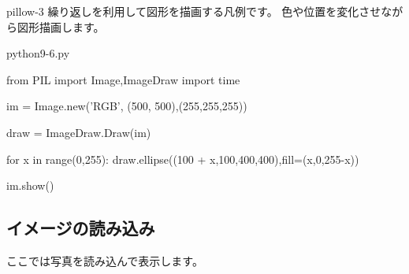 \documentclass[11pt,a4paper,dvipdfmx,titlepage]{jsreport}
\begin{document}
\begin{pabox}{pillow-3}
繰り返しを利用して図形を描画する凡例です。
色や位置を変化させながら図形描画します。


\begin{codebox}{python9-6.py}
\begin{listing}{1}
from PIL import Image,ImageDraw
import time

im = Image.new('RGB', (500, 500),(255,255,255))

draw = ImageDraw.Draw(im)

for x in range(0,255):
    draw.ellipse((100 + x,100,400,400),fill=(x,0,255-x))  

im.show()
\end{listing}
\end{codebox}
\end{pabox}

\subsection{イメージの読み込み}
ここでは写真を読み込んで表示します。
\end{document}
